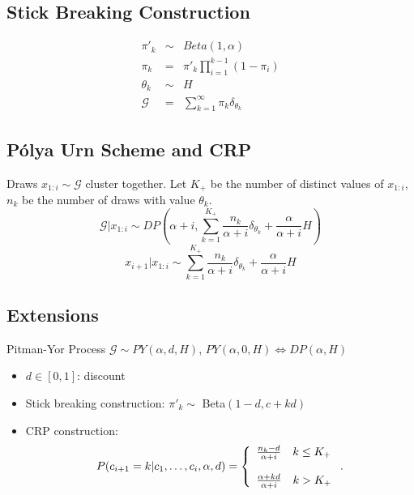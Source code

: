 \documentclass{beamer}
\begin{document}
\subsection{Stick Breaking Construction}
\begin{frame}
\begin{eqnarray*}
\pi'_k & \sim & Beta(1,\alpha) \\
\pi_k & = & \pi'_k \prod_{i=1}^{k-1}(1-\pi_i) \\
\theta_k & \sim & H \\
\mathcal{G} & = & \sum_{k=1}^{\infty} \pi_k \delta_{\theta_k}
\end{eqnarray*}
\end{frame}

\subsection{P\'{o}lya Urn Scheme and CRP}
\begin{frame}
Draws $x_{1:i} \sim \mathcal{G}$ cluster together.  Let $K_+$ be the number of distinct values of $x_{1:i}$, $n_k$ be the number of draws with value $\theta_k$. 
\begin{equation*}
\mathcal{G}|x_{1:i} \sim DP\left(\alpha + i, \sum_{k=1}^{K_+} \frac{n_k}{\alpha + i}\delta_{\theta_k} + \frac{\alpha}{\alpha+i}H\right)
\end{equation*}
\begin{equation*}
x_{i+1}|x_{1:i} \sim \sum_{k=1}^{K_+} \frac{n_k}{\alpha + i}\delta_{\theta_k} + \frac{\alpha}{\alpha+i}H
\end{equation*}
\end{frame}

\subsection{Extensions}
\begin{frame}
\begin{block}{Pitman-Yor Process}
$\mathcal{G} \sim PY(\alpha,d,H)$,  $PY(\alpha,0,H) \Leftrightarrow DP(\alpha,H)$
\begin{itemize}
\item{$d \in [0,1]$:  discount}
\item{Stick breaking construction: $\pi'_k \sim$ Beta$(1-d,c+kd)$}
\item{CRP construction:}
\begin{equation*}
P(c_{i+1} = k | c_1,\ldots,c_{i},\alpha,d) = 
\left\{ \begin{array}{l} 
       \frac{n_k - d}{\alpha+i} \quad k \leq K_+\bigskip\\ 
	\frac{\alpha + kd}{\alpha+i} \quad k>K_+ \end{array} \right..
\label{eqn:pyp-crp}
\end{equation*}

\end{itemize}
\end{block}
\end{frame}
\end{document}
